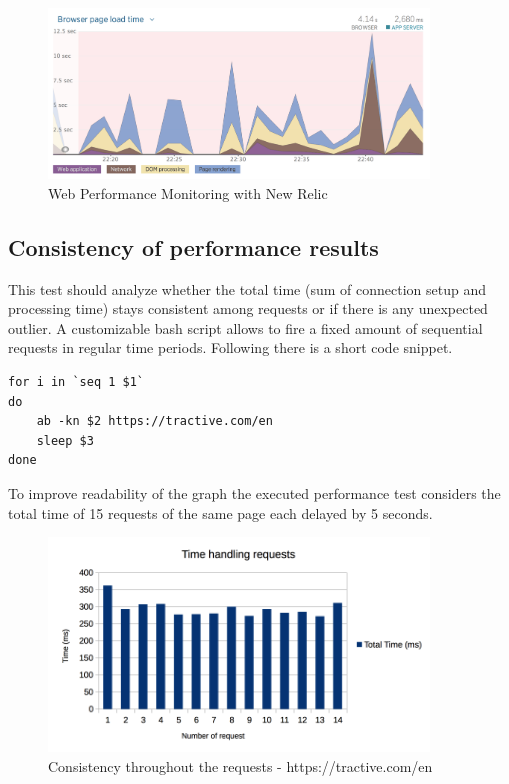 \begin{figure}[h!]
	\centering
		\includegraphics[width=0.9\textwidth]{imgs/newrelic_load.png}
	\caption{Web Performance Monitoring with New Relic}
	\label{fig:newrelic2}
\end{figure}  

\subsection{Consistency of performance results}
This test should analyze whether the total time (sum of connection setup and processing time) stays consistent among requests or if there is any unexpected outlier. 
A customizable bash script allows to fire a fixed amount of sequential requests in regular time periods. Following there is a short code snippet.

\begin{lstlisting}
for i in `seq 1 $1`
do
	ab -kn $2 https://tractive.com/en
	sleep $3
done 
\end{lstlisting}

To improve readability of the graph the executed performance test considers the total time of 15 requests of the same page each delayed by 5 seconds.

\begin{figure}[h!]
	\centering
		\includegraphics[width=0.9\textwidth]{imgs/consistency.png}
	\caption{Consistency throughout the requests - https://tractive.com/en}
\end{figure}

